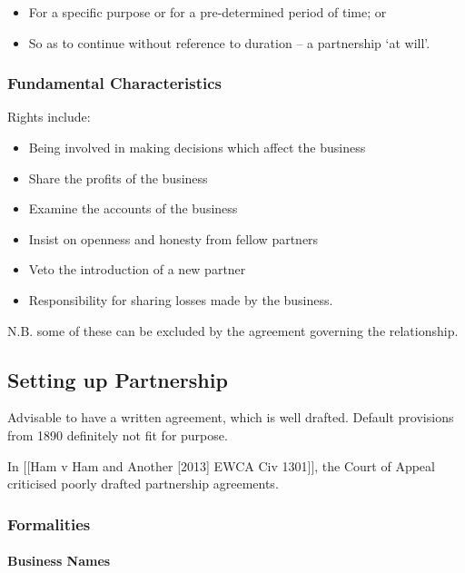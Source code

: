 \documentclass[
]{article}
\providecommand{\tightlist}{%
  \setlength{\itemsep}{0pt}\setlength{\parskip}{0pt}}
\begin{document}
\begin{itemize}
\tightlist
\item
  For a specific purpose or for a pre-determined period of time; or
\item
  So as to continue without reference to duration -- a partnership `at
  will'.
\end{itemize}

\hypertarget{fundamental-characteristics}{%
\subsubsection{Fundamental
Characteristics}\label{fundamental-characteristics}}

Rights include:

\begin{itemize}
\tightlist
\item
  Being involved in making decisions which affect the business
\item
  Share the profits of the business
\item
  Examine the accounts of the business
\item
  Insist on openness and honesty from fellow partners
\item
  Veto the introduction of a new partner
\item
  Responsibility for sharing losses made by the business.
\end{itemize}

N.B. some of these can be excluded by the agreement governing the
relationship.

\hypertarget{setting-up-partnership}{%
\subsection{Setting up Partnership}\label{setting-up-partnership}}

Advisable to have a written agreement, which is well drafted. Default
provisions from 1890 definitely not fit for purpose.

In {[}{[}Ham v Ham and Another {[}2013{]} EWCA Civ 1301{]}{]}, the Court
of Appeal criticised poorly drafted partnership agreements.

\hypertarget{formalities}{%
\subsubsection{Formalities}\label{formalities}}

\hypertarget{business-names}{%
\paragraph{Business Names}\label{business-names}}
\end{document}
